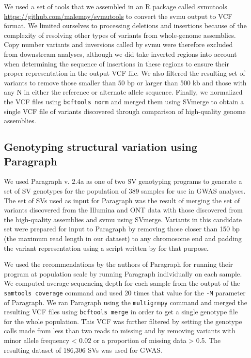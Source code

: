 We used a set of tools that we assembled in an R package called svmutools
\url{https://github.com/malemay/svmutools} to convert the svmu output to VCF
format. We limited ourselves to processing deletions and insertions because of
the complexity of resolving other types of variants from whole-genome
assemblies.  Copy number variants and inversions called by svmu were therefore
excluded from downstream analyses, although we did take inverted regions into
account when determining the sequence of insertions in these regions to ensure
their proper representation in the output VCF file. We also filtered the
resulting set of variants to remove those smaller than 50 bp or larger than 500
kb and those with any N in either the reference or alternate allele sequence.
Finally, we normalized the VCF files using \texttt{bcftools norm} and merged
them using SVmerge to obtain a single VCF file of variants discovered through
comparison of high-quality genome assemblies.

\subsection*{Genotyping structural variation using Paragraph}
\label{sv-gwas-sv-genotyping-paragraph}

We used Paragraph v. 2.4a \citep{chen2019} as one of two SV genotyping programs
to generate a set of SV genotypes for the population of 389 samples for use in
GWAS analyses.  The set of SVs used as input for Paragraph was the result of
merging the set of variants discovered from the Illumina and ONT data with
those discovered from the high-quality assemblies and svmu using SVmerge.
Variants in this candidate set were prepared for input to Paragraph by removing
those closer than 150 bp (the maximum read length in our dataset) to any
chromosome end and padding the variant representation using a script written by
\cite{hickey2020} for that purpose.

We used the recommendations by the authors of Paragraph for running their
program at population scale by running Paragraph individually on each sample.
We computed average sequencing depth for each sample from the output of the
\texttt{samtools coverage} command and used 20 times that value for the
\texttt{-M} parameter of Paragraph.  We ran Paragraph using the
\texttt{multigrmpy} command and merged the resulting VCF files using
\texttt{bcftools merge} in order to get a  single genotype file for the whole
population. This VCF was further filtered by setting the genotype calls made
from less than two reads to missing and by removing variants with minor allele
frequency < 0.02 or a proportion of missing data > 0.5. The resulting dataset
of 186,306 SVs was used for GWAS.

